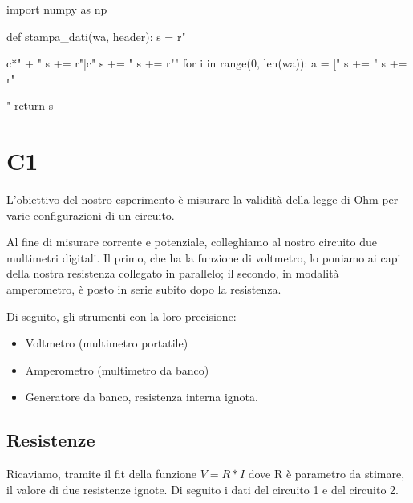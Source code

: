 \begin{sagesilent}
import numpy as np

def stampa_dati(wa, header):
  s = r"\begin{tabular}{c*{" + "%
  s += r"}{|c}}"
  s += "%
  s += r"\midrule"
  for i in range(0, len(wa)):
    a = ["%
    s += "%
  s += r"\end{tabular}"
  return s
\end{sagesilent}



\chapter{C1}

L'obiettivo del nostro esperimento è misurare la validità della legge di Ohm per varie configurazioni di un circuito. 

Al fine di misurare corrente e potenziale, colleghiamo al nostro circuito due multimetri digitali. Il primo, che ha la funzione di voltmetro, lo poniamo ai capi della nostra resistenza collegato in parallelo; il secondo, in modalità amperometro, è posto in serie subito dopo la resistenza. 

Di seguito, gli strumenti con la loro precisione:
\begin{itemize}
\item Voltmetro (multimetro portatile)
\item Amperometro (multimetro da banco)
\item Generatore da banco, resistenza interna ignota.
\end{itemize}


\section{Resistenze}

Ricaviamo, tramite  il fit della funzione $V=R*I$ dove R è parametro da stimare, il valore di due resistenze ignote. Di seguito i dati del circuito 1 e del circuito 2. 



